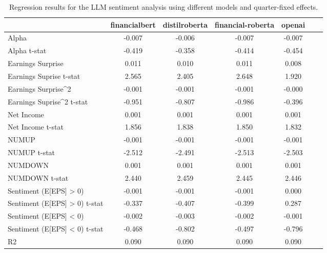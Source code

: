 \begin{table}
\caption{Regression results for the LLM sentiment analysis using different models and quarter-fixed effects.}
\label{tab:llm_regressions_split_quarter_fixed}
\begin{tabular}{lcccccc}
\toprule
 & financialbert & distilroberta & financial-roberta & openai \\
\midrule
Alpha & -0.007 & -0.006 & -0.007 & -0.007 \\
Alpha t-stat & -0.419 & -0.358 & -0.414 & -0.454 \\
Earnings Surprise & 0.011 & 0.010 & 0.011 & 0.008 \\
Earnings Suprise t-stat & 2.565 & 2.405 & 2.648 & 1.920 \\
Earnings Surprise^2 & -0.001 & -0.001 & -0.001 & -0.000 \\
Earnings Suprise^2 t-stat & -0.951 & -0.807 & -0.986 & -0.396 \\
Net Income & 0.001 & 0.001 & 0.001 & 0.001 \\
Net Income t-stat & 1.856 & 1.838 & 1.850 & 1.832 \\
NUMUP & -0.001 & -0.001 & -0.001 & -0.001 \\
NUMUP t-stat & -2.512 & -2.491 & -2.513 & -2.503 \\
NUMDOWN & 0.001 & 0.001 & 0.001 & 0.001 \\
NUMDOWN t-stat & 2.440 & 2.459 & 2.445 & 2.446 \\
Sentiment (E[EPS] > 0) & -0.001 & -0.001 & -0.001 & 0.000 \\
Sentiment (E[EPS] > 0) t-stat & -0.337 & -0.407 & -0.399 & 0.287 \\
Sentiment (E[EPS] < 0) & -0.002 & -0.003 & -0.002 & -0.001 \\
Sentiment (E[EPS] < 0) t-stat & -0.468 & -0.802 & -0.497 & -0.796 \\
R2 & 0.090 & 0.090 & 0.090 & 0.090 \\
\bottomrule
\end{tabular}
\end{table}

